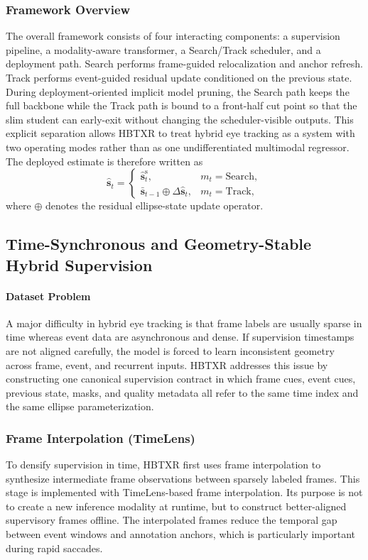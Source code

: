 \documentclass[journal]{IEEEtran}
\begin{document}
\subsubsection{Framework Overview}
The overall framework consists of four interacting components: a supervision pipeline, a modality-aware transformer, a Search/Track scheduler, and a deployment path. Search performs frame-guided relocalization and anchor refresh. Track performs event-guided residual update conditioned on the previous state. During deployment-oriented implicit model pruning, the Search path keeps the full backbone while the Track path is bound to a front-half cut point so that the slim student can early-exit without changing the scheduler-visible outputs. This explicit separation allows HBTXR to treat hybrid eye tracking as a system with two operating modes rather than as one undifferentiated multimodal regressor. The deployed estimate is therefore written as
\begin{equation}
\hat{\mathbf{s}}_t=
\begin{cases}
\hat{\mathbf{s}}_t^{\mathrm{s}}, & m_t=\mathrm{Search},\\
\bar{\mathbf{s}}_{t-1}\oplus\Delta\hat{\mathbf{s}}_t, & m_t=\mathrm{Track},
\end{cases}
\end{equation}
where $\oplus$ denotes the residual ellipse-state update operator.


\subsection{Time-Synchronous and Geometry-Stable Hybrid Supervision}
\paragraph*{Dataset Problem}
A major difficulty in hybrid eye tracking is that frame labels are usually sparse in time whereas event data are asynchronous and dense. If supervision timestamps are not aligned carefully, the model is forced to learn inconsistent geometry across frame, event, and recurrent inputs. HBTXR addresses this issue by constructing one canonical supervision contract in which frame cues, event cues, previous state, masks, and quality metadata all refer to the same time index and the same ellipse parameterization.

\subsubsection{Frame Interpolation (TimeLens)}
To densify supervision in time, HBTXR first uses frame interpolation to synthesize intermediate frame observations between sparsely labeled frames. This stage is implemented with TimeLens-based frame interpolation. Its purpose is not to create a new inference modality at runtime, but to construct better-aligned supervisory frames offline. The interpolated frames reduce the temporal gap between event windows and annotation anchors, which is particularly important during rapid saccades.
\end{document}
